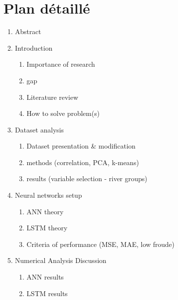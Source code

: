 \section*{Plan détaillé}

\begin{enumerate}
   \item Abstract \newline
   
   
   \item Introduction
   \begin{enumerate}
    \item Importance of research
    \item gap
    \item Literature review
    \item How to solve problem(s)
   \end{enumerate}
   \item Dataset analysis
   \begin{enumerate}
        \item Dataset presentation & modification
        \item methods (correlation, PCA, k-means)
        \item results (variable selection - river groups)
   \end{enumerate}
   \item Neural networks setup 
   \begin{enumerate}
       \item ANN theory
       \item LSTM theory
       \item Criteria of performance (MSE, MAE, low froude)
       
   \end{enumerate}
   \item Numerical Analysis Discussion
   \begin{enumerate}
          \item ANN results
       \item LSTM results
   \end{enumerate}
    
\end{enumerate}

